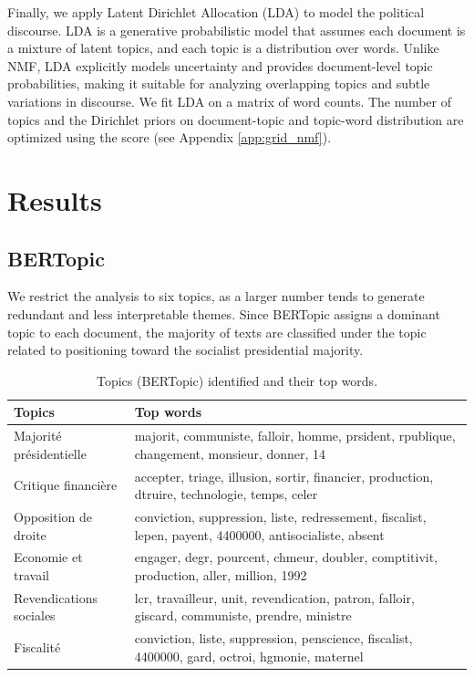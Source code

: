 \documentclass{article}
\begin{document}
Finally, we apply Latent Dirichlet Allocation (LDA) \citep{blei2003latent} to model the political discourse. LDA is a generative probabilistic model that assumes each document is a mixture of latent topics, and each topic is a distribution over words. Unlike NMF, LDA explicitly models uncertainty and provides document-level topic probabilities, making it suitable for analyzing overlapping topics and subtle variations in discourse. We fit LDA on a matrix of word counts. The number of topics and the Dirichlet priors on document-topic and topic-word distribution are optimized using the score (see Appendix \ref{app:grid_nmf}).

\section{Results}

\subsection{BERTopic}
We restrict the analysis to six topics, as a larger number tends to generate redundant and less interpretable themes. Since BERTopic assigns a dominant topic to each document, the majority of texts are classified under the topic related to positioning toward the socialist presidential majority.

\begin{table}[htbp]
\centering
\small
\begin{tabular}{@{} l p{10cm} @{}}
\toprule
\textbf{Topics} & \textbf{Top words} \\
\midrule
Majorité présidentielle & majorit, communiste, falloir, homme, prsident, rpublique, changement, monsieur, donner, 14 \\
Critique financière & accepter, triage, illusion, sortir, financier, production, dtruire, technologie, temps, celer \\
Opposition de droite & conviction, suppression, liste, redressement, fiscalist, lepen, payent, 4400000, antisocialiste, absent \\
Economie et travail & engager, degr, pourcent, chmeur, doubler, comptitivit, production, aller, million, 1992 \\
Revendications sociales & lcr, travailleur, unit, revendication, patron, falloir, giscard, communiste, prendre, ministre \\
Fiscalité & conviction, liste, suppression, penscience, fiscalist, 4400000, gard, octroi, hgmonie, maternel \\
\bottomrule
\end{tabular}
\caption{Topics (BERTopic) identified and their top words.}
\label{tab:topics_summary}
\end{table}
\end{document}
